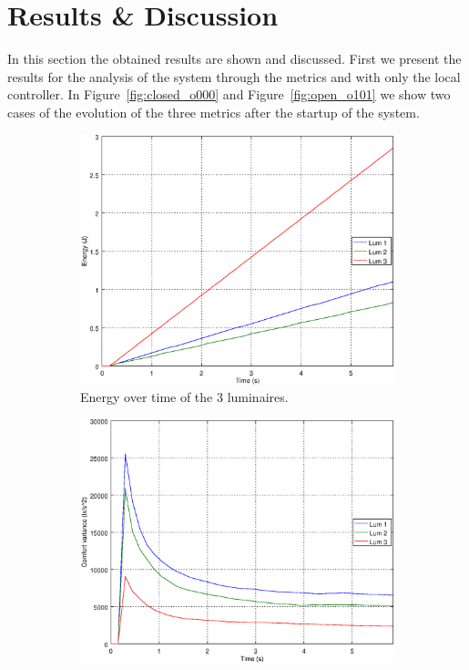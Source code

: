 \section{Results \& Discussion}\label{results}


In this section the obtained results are shown and discussed. First we present the results for the analysis of the system through the metrics and with only the local controller. In Figure~\ref{fig:closed_o000} and Figure~\ref{fig:open_o101}  we show two cases of the evolution of the three metrics after the startup of the system.

\begin{figure}[ht]
    \centering
    \begin{subfigure}[t]{0.32\textwidth}
    \centering
    \includegraphics[width=.95\textwidth]{img/e_closed_o000}
    \caption{Energy over time of the 3 luminaires.}
    \label{fig:e_closed_o000}
    \end{subfigure}
    \begin{subfigure}[t]{0.32\textwidth}
    \centering
    \includegraphics[width=.95\textwidth]{img/f_closed_o000}

\end{subfigure}
\end{figure}
